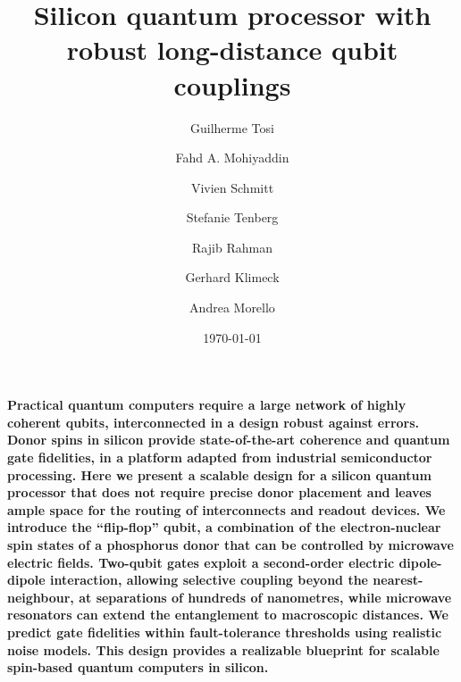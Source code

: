 \documentclass[aps,prb,superscriptaddress,nobibnotes,preprint]{revtex4-1}%
\begin{document}
\title[]{Silicon quantum processor with robust long-distance qubit couplings}

\author{Guilherme Tosi}
\author{Fahd A. Mohiyaddin}
\author{Vivien Schmitt}
\author{Stefanie Tenberg}
\author{Rajib Rahman}
\author{Gerhard Klimeck}
\author{Andrea Morello}

\date{\today}


\maketitle

\textbf{Practical quantum computers require a large network of highly coherent qubits, interconnected in a design robust against errors. Donor spins in silicon provide state-of-the-art coherence and quantum gate fidelities, in a platform adapted from industrial semiconductor processing. Here we present a scalable design for a silicon quantum processor that does not require precise donor placement and leaves ample space for the routing of interconnects and readout devices. We introduce the “flip-flop” qubit, a combination of the electron-nuclear spin states of a phosphorus donor that can be controlled by microwave electric fields. Two-qubit gates exploit a second-order electric dipole-dipole interaction, allowing selective coupling beyond the nearest-neighbour, at separations of hundreds of nanometres, while microwave resonators can extend the entanglement to macroscopic distances. We predict gate fidelities within fault-tolerance thresholds using realistic noise models. This design provides a realizable blueprint for scalable spin-based quantum computers in silicon.}
\vspace{1.5mm}
\end{document}
